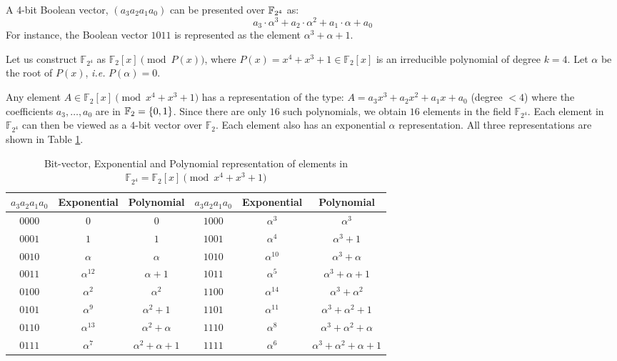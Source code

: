 \begin{Example}
A 4-bit Boolean vector, $(a_{3} a_{2} a_{1} a_{0})$
can be presented over ${\mathbb{F}}_{2^4}$ as: 
\begin{equation}
a_3 \cdot \alpha^3+a_2 \cdot \alpha^2+a_1 \cdot \alpha+a_0
\end{equation}
For instance, the Boolean vector $1011$ is represented as the element 
$\alpha^3+\alpha+1$.
\end{Example}

\begin{Example}\label{exp:1}
Let us construct $\mathbb{F}_{2^4}$ as $\mathbb{F}_2[x] \pmod{ P(x)}$, where
$P(x)=x^4+x^3+1 \in \mathbb{F}_2[x]$ is an irreducible polynomial of degree $k=4$. 
Let $\alpha$ be the root of $P(x)$, {\it i.e.} $P(\alpha)=0$. 

Any element $A \in \mathbb{F}_2[x] \pmod{ x^4 + x^3 + 1}$
has a representation of the type: $A = a_3 x^3 + a_2 x^2 +
a_1 x + a_0$ (degree $< 4$) where the coefficients $a_3, \dots, a_0$ are in ${\mathbb{F}}_2 =
\{0, 1\}$. Since there are only $16$ such polynomials, we obtain
$16$ elements in the field $\mathbb{F}_{2^4}$. Each element in
$\mathbb{F}_{2^4}$ can then be viewed as a $4$-bit vector over $\mathbb{F}_{2}$. 
Each element also has an exponential $\alpha$
representation. All three representations are shown in Table
\ref{tab:gfelement}.

\begin{table}[h]
\begin{center}
\caption{Bit-vector, Exponential and Polynomial representation of
elements in  $\mathbb{F}_{2^4} = \mathbb{F}_2[x] \pmod{x^4+x^3+1}$}\label{tab:gfelement} 
\begin{tabular}{|c|c|c||c|c|c|} 
\hline
$a_3a_2a_1a_0$ & Exponential & Polynomial     &$a_3a_2a_1a_0$ & Exponential & Polynomial  \\
\hline
$0000$        & $0$         & $0$            & $1000$ & $\alpha^3$ &  $\alpha^3$\\
\hline
$0001$        & $1$         & $1$            & $1001$ & $\alpha^4$ & $\alpha^3 + 1$\\
\hline
$0010$        & $\alpha$    & $\alpha$       & $1010$ & $\alpha^{10}$&$\alpha^3 + \alpha$  \\
\hline
$0011$        & $\alpha^{12}$& $\alpha + 1$   & $1011$ & $\alpha^5$ & $\alpha^3+\alpha+1$\\
\hline
$0100$        & $\alpha^2$  & $\alpha^2$     &  $1100$ & $\alpha^{14}$ & $\alpha^3 + \alpha^2$\\
\hline
$0101$        & $\alpha^9$   &$\alpha^2 + 1$ & $1101$  &$\alpha^{11}$  & $\alpha^3+\alpha^2+1$\\
\hline
$0110$        & $\alpha^{13}$& $\alpha^2 + \alpha$ & $1110$ & $\alpha^8$& $\alpha^3+\alpha^2+\alpha$\\
\hline
$0111$        &$\alpha^7 $ & $\alpha^2+\alpha+1$ & $1111$ &$\alpha^6$ & $\alpha^3+\alpha^2+\alpha+1$\\
\hline
\end{tabular}
\end{center}
\end{table}


\end{Example}
